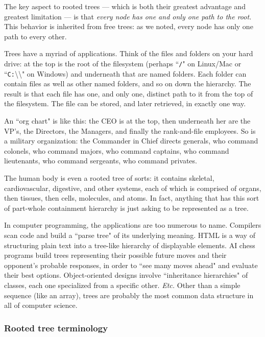 The key aspect to rooted trees --- which is both their greatest advantage
and greatest limitation --- is that \textit{every node has one and only one
path to the root.} This behavior is inherited from free trees: as we noted,
every node has only one path to every other.

Trees have a myriad of applications. Think of the files and folders on your
hard drive: at the top is the root of the filesystem (perhaps ``\texttt{/}"
on Linux/Mac or ``\texttt{C:}\textbackslash\textbackslash" on Windows) and
underneath that are named folders. Each folder can contain files as well as
other named folders, and so on down the hierarchy. The result is that each
file has one, and only one, distinct path to it from the top of the
filesystem.  The file can be stored, and later retrieved, in exactly one
way.

An ``org chart" is like this: the CEO is at the top, then underneath her
are the VP's, the Directors, the Managers, and finally the rank-and-file
employees. So is a military organization: the Commander in Chief directs
generals, who command colonels, who command majors, who command captains,
who command lieutenants, who command sergeants, who command privates.

The human body is even a rooted tree of sorts: it contains skeletal,
cardiovascular, digestive, and other systems, each of which is comprised of
organs, then tissues, then cells, molecules, and atoms. In fact, anything
that has this sort of part-whole containment hierarchy is just asking to be
represented as a tree.

In computer programming, the applications are too numerous to name.
Compilers scan code and build a ``parse tree" of its underlying meaning.
HTML is a way of structuring plain text into a tree-like hierarchy of
displayable elements. AI chess programs build trees representing their
possible future moves and their opponent's probable responses, in order to
``see many moves ahead" and evaluate their best options. Object-oriented
designs involve ``inheritance hierarchies" of classes, each one specialized
from a specific other. \textit{Etc.} Other than a simple sequence (like an
array), trees are probably the most common data structure in all of
computer science.

\subsubsection{Rooted tree terminology}


